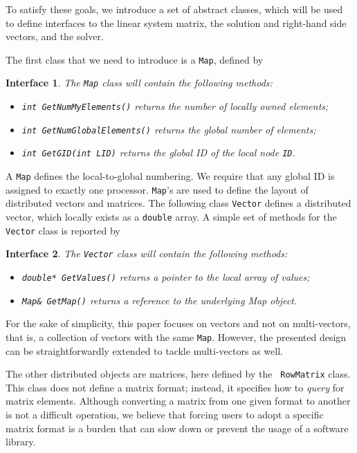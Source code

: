 \documentclass[acmtocl]{acmtrans2m}
\newtheorem{interface}{Interface}[section]
\begin{document}
To satisfy these goals, we introduce a set of abstract classes, which will be
used to define interfaces to the linear system matrix, the solution and
right-hand side vectors, and the solver.

\smallskip

The first class that we need to introduce is a {\tt Map}, defined by
\begin{interface}
\label{int:map}
The {\tt Map} class will contain the following methods:

\begin{itemize}
\item {\tt int GetNumMyElements()} returns the number of locally owned elements;
\item {\tt int GetNumGlobalElements()} returns the global number of elements;
\item {\tt int GetGID(int LID)} returns the global ID of the local node {\tt ID}.
\end{itemize}
\end{interface}
A {\tt Map} defines the local-to-global numbering. We require that any global
ID is assigned to exactly one processor. {\tt Map}'s are used to define the
layout of distributed vectors and matrices. The following class {\tt Vector} defines a
distributed vector, which locally exists as a {\tt double} array.
A simple set of methods for the {\tt Vector} class is reported by 
\begin{interface}
\label{int:vector}
The {\tt Vector} class will contain the following methods:

\begin{itemize}
\item {\tt double* GetValues()} returns a pointer to the local array of values;
\item {\tt Map\& GetMap()} returns a reference to the underlying Map object.
\end{itemize}
\end{interface}

For the sake of simplicity, this paper focuses on vectors and not on
multi-vectors, that is, a collection of vectors with the same {\tt Map}.
However, the presented design can be straightforwardly extended to tackle
multi-vectors as well.

\smallskip

The other distributed objects are matrices, here defined by the {\tt
  RowMatrix} class.  This class does not define a matrix format; instead, it
  specifies how to {\sl query} for matrix elements. Although converting a
  matrix from one given format to another is not a difficult operation,
we believe that forcing
users to adopt a specific matrix format is a burden that can slow down or
prevent the usage of a software library.
\end{document}
